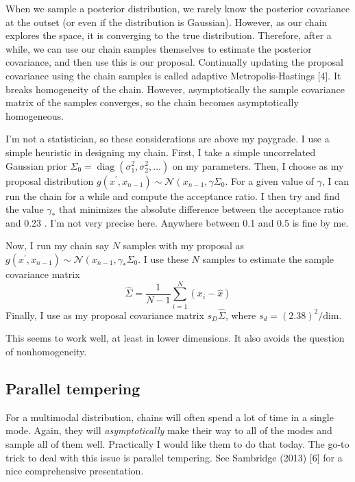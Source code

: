\documentclass[11pt]{article}
\begin{document}
When we sample a posterior distribution, we rarely know the posterior covariance at the outset (or even if the distribution is Gaussian). However, as our chain explores the space, it is converging to the true distribution. Therefore, after a while, we can use our chain samples themselves to estimate the posterior covariance, and then use this is our proposal. Continually updating the proposal covariance using the chain samples is called adaptive Metropolis-Hastings [4]. It breaks homogeneity of the chain. However, asymptotically the sample covariance matrix of the samples converges, so the chain becomes asymptotically homogeneous.

I'm not a statistician, so these considerations are above my paygrade. I use a simple heuristic in designing my chain. First, I take a simple uncorrelated Gaussian prior $\Sigma_{0}=\operatorname{diag}\left(\sigma_{1}^{2}, \sigma_{2}^{2}, \ldots\right)$ on my parameters. Then, I choose as my proposal distribution $g\left(x^{\prime}, x_{n-1}\right) \sim \mathcal{N}\left(x_{n-1}, \gamma \Sigma_{0}\right.$. For a given value of $\gamma$, I can run the chain for a while and compute the acceptance ratio. I then try and find the value $\gamma_{*}$ that minimizes the absolute difference between the acceptance ratio and 0.23 . I'm not very precise here. Anywhere between 0.1 and 0.5 is fine by me.

Now, I run my chain say $N$ samples with my proposal as $g\left(x^{\prime}, x_{n-1}\right) \sim \mathcal{N}\left(x_{n-1}, \gamma_{*} \Sigma_{0}\right.$. I use these $N$ samples to estimate the sample covariance matrix
\begin{equation}
\hat{\Sigma}=\frac{1}{N-1} \sum_{i=1}^{N}\left(x_{i}-\hat{x}\right)
\end{equation}
Finally, I use as my proposal covariance matrix $s_{D} \hat{\Sigma}$, where $s_{d}=(2.38)^{2} / \mathrm{dim}$.

This seems to work well, at least in lower dimensions. It also avoids the question of nonhomogeneity.

\subsection{Parallel tempering}

For a multimodal distribution, chains will often spend a lot of time in a single mode. Again, they will \emph{asymptotically} make their way to all of the modes and sample all of them well. Practically I would like them to do that today. The go-to trick to deal with this issue is parallel tempering. See Sambridge (2013) [6] for a nice comprehensive presentation.
\end{document}
